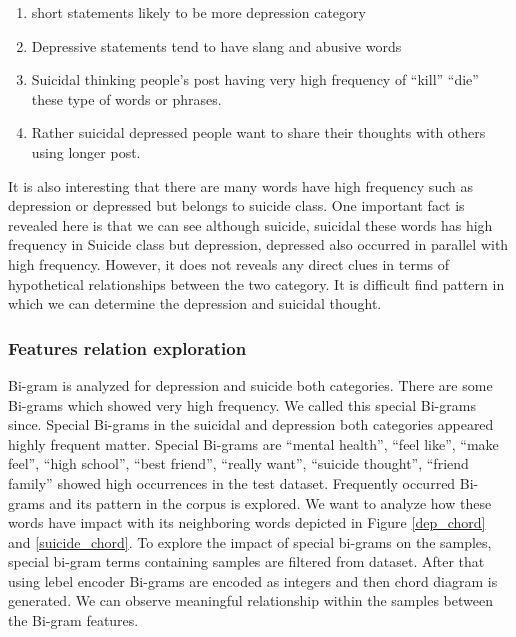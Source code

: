 \documentclass[sn-mathphys,Numbered]{sn-jnl}%
\theoremstyle{thmstyleone}%
\theoremstyle{thmstyletwo}%
\theoremstyle{thmstylethree}%
\begin{document}
\begin{enumerate}
\item short statements likely to be more depression category
\item Depressive statements tend to have slang and abusive words
\item Suicidal thinking people’s post having very high frequency of “kill” “die” these type of words or phrases.
\item Rather suicidal depressed people want to share their thoughts with others using longer post.
\end{enumerate}

It is also interesting that there are many words have high frequency such as depression or depressed but belongs to suicide class. One important fact is revealed here is that we can see although suicide, suicidal these words has high frequency in Suicide class but depression, depressed also occurred in parallel with high frequency. However, it does not reveals any direct clues in terms of hypothetical relationships between the two category. It is difficult find pattern in which we can determine the depression and suicidal thought.  

\subsubsection{Features relation exploration}
Bi-gram is analyzed for depression and suicide both categories. There are some Bi-grams which showed very high frequency. We called this special Bi-grams since. Special Bi-grams in the suicidal and depression both categories appeared highly frequent matter. Special Bi-grams are \enquote{mental health}, \enquote{feel like}, \enquote{make feel}, \enquote{high school}, \enquote{best friend}, \enquote{really want}, \enquote{suicide thought}, \enquote{friend family} showed high occurrences in the test dataset. Frequently occurred Bi-grams and its pattern in the corpus is explored. We want to analyze how these words have impact with its neighboring words depicted in Figure \ref{dep_chord} and \ref{suicide_chord}. To explore the impact of special bi-grams on the samples, special bi-gram terms containing samples are filtered from dataset. After that using lebel encoder Bi-grams are encoded as integers and then chord diagram is generated. We can observe meaningful relationship within the samples between the Bi-gram features.  
\end{document}
